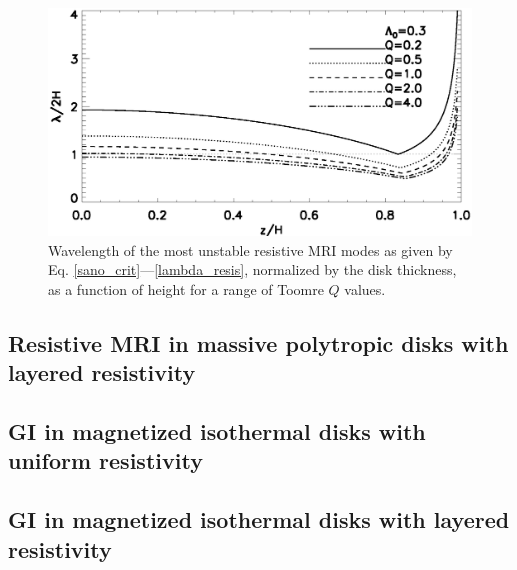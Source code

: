 \begin{figure}
  \includegraphics[width=\linewidth]{figures/lambda_poly_uniresis}
  \caption{Wavelength of the most unstable resistive MRI modes as given by
    Eq. \ref{sano_crit}---\ref{lambda_resis}, normalized by the 
    disk thickness, as a function of height for a range of Toomre $Q$
    values.  
    \label{lambda_poly_resis}}
\end{figure}


\subsection{Resistive MRI in massive polytropic disks with layered
  resistivity} 


\subsection{GI in magnetized isothermal disks with uniform
  resistivity} 


\subsection{GI in magnetized isothermal disks with layered
  resistivity} 
